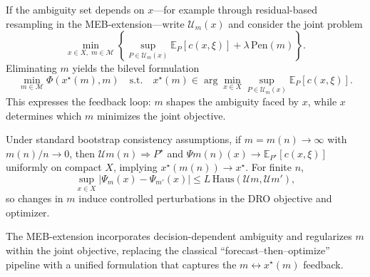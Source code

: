 \documentclass[poms,final,nonblindrev]{poms1_V1} %
\begin{document}
If the ambiguity set depends on $x$—for example through residual-based resampling in the MEB-extension—write $\mathcal{U}_m(x)$ and consider the joint problem
\begin{equation}
	\min_{x\in X,\; m\in\mathcal{M}}
	\left\{
	\sup_{P\in\mathcal{U}_m(x)} \mathbb{E}_P[c(x,\xi)]
	+ \lambda\,\mathrm{Pen}(m)
	\right\}.
\end{equation}
Eliminating $m$ yields the bilevel formulation
\begin{equation}
	\min_{m\in\mathcal{M}} 
	\Phi(x^\star(m),m)
	\quad\text{s.t.}\quad
	x^\star(m)\in\arg\min_{x\in X}
	\sup_{P\in\mathcal{U}_m(x)}\mathbb{E}_P[c(x,\xi)].
\end{equation}
This expresses the feedback loop: $m$ shapes the ambiguity faced by $x$, while $x$ determines which $m$ minimizes the joint objective.

Under standard bootstrap consistency assumptions, if $m=m(n)\to\infty$ with $m(n)/n\to 0$, then $\mathcal{U}{m(n)}\Rightarrow P^\star$ and $\Psi{m(n)}(x)\to\mathbb{E}_{P^\star}[c(x,\xi)]$ uniformly on compact $X$, implying $x^\star(m(n))\to x^\star$. For finite $n$,
\begin{equation}
	\sup_{x\in X}\big|\Psi_m(x)-\Psi_{m'}(x)\big|
	\le 
	L\,\mathrm{Haus}\!\left(\mathcal{U}m,\mathcal{U}{m'}\right),
\end{equation}
so changes in $m$ induce controlled perturbations in the DRO objective and optimizer.

The MEB-extension incorporates decision-dependent ambiguity and regularizes $m$ within the joint objective, replacing the classical ``forecast--then--optimize'' pipeline with a unified formulation that captures the $m\leftrightarrow x^\star(m)$ feedback.

\end{document}
